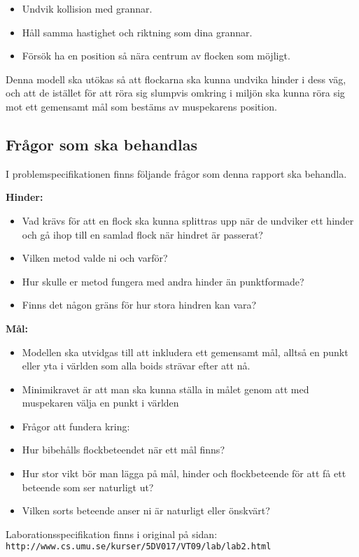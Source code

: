 \documentclass[titlepage, a4paper, 12pt]{article}
\begin{document}
\begin{itemize}
\item Undvik kollision med grannar.
\item Håll samma hastighet och riktning som dina grannar.
\item Försök ha en  position så nära centrum av flocken som möjligt.
\end{itemize}

Denna modell ska utökas så att flockarna ska kunna undvika hinder i
dess väg, och att de istället för att röra sig slumpvis omkring i
miljön ska kunna röra sig mot ett gemensamt mål som bestäms av
muspekarens position.

\subsection{Frågor som ska behandlas}
I problemspecifikationen finns följande frågor som denna rapport ska
behandla.

\textbf{Hinder:}
\begin{itemize}
\item Vad krävs för att en flock ska kunna splittras upp när de
  undviker ett hinder och gå ihop till en samlad flock när hindret är
  passerat?
\item Vilken metod valde ni och varför?
\item Hur skulle er metod fungera med andra hinder än punktformade?
\item Finns det någon gräns för hur stora hindren kan vara?
\end{itemize}

\textbf{Mål:}
\begin{itemize}
\item Modellen ska utvidgas till att inkludera ett gemensamt mål,
  alltså en punkt eller yta i världen som alla boids strävar efter att
  nå.
\item Minimikravet är att man ska kunna ställa in målet genom att med
  muspekaren välja en punkt i världen
\item Frågor att fundera kring:
\item Hur bibehålls flockbeteendet när ett mål finns?
\item Hur stor vikt bör man lägga på mål, hinder och flockbeteende för
  att få ett beteende som ser naturligt ut?
\item Vilken sorts beteende anser ni är naturligt eller önskvärt? 
\end{itemize}

Laborationsspecifikation finns i original på sidan:\\
\verb!http://www.cs.umu.se/kurser/5DV017/VT09/lab/lab2.html!
\end{document}
